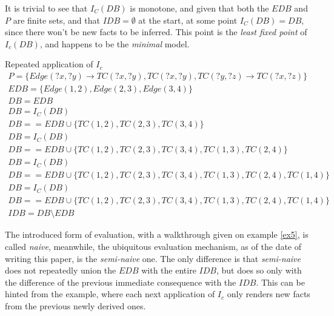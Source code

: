 It is trivial to see that $I_C(DB)$ is monotone, and given that both the $EDB$ and $P$ are finite sets, and that $IDB = \emptyset$ at the start,
at some point $I_C(DB) = DB$, since there won't be new facts to be inferred. This point is the \textit{least fixed point} of $I_c(DB)$\cite{datalog},
and happens to be the \textit{minimal} model.
\begin{exmp}{Repeated application of $I_c$}\label{ex5}
	\begin{align*}
		P = \{ Edge(?x, ?y) \rightarrow TC(?x, ?y), TC(?x, ?y), TC(?y, ?z) \rightarrow TC(?x, ?z) \} \\
		EDB = \{ Edge(1, 2), Edge(2, 3), Edge(3, 4) \}                                               \\
		DB = EDB                                                                                     \\
		DB = I_C(DB)                                                                                 \\
		DB == EDB \cup \{ TC(1, 2), TC(2, 3), TC(3, 4) \}                                            \\
		DB = I_C(DB)                                                                                 \\
		DB == EDB \cup \{ TC(1, 2), TC(2, 3), TC(3, 4), TC(1, 3), TC(2, 4) \}                        \\
		DB = I_C(DB)                                                                                 \\
		DB == EDB \cup \{ TC(1, 2), TC(2, 3), TC(3, 4), TC(1, 3), TC(2, 4), TC(1, 4) \}              \\
		DB = I_C(DB)                                                                                 \\
		DB == EDB \cup \{ TC(1, 2), TC(2, 3), TC(3, 4), TC(1, 3), TC(2, 4), TC(1, 4) \}              \\
		IDB = DB \setminus EDB
	\end{align*}
\end{exmp}
The introduced form of evaluation, with a walkthrough given on example \ref{ex5}, is called \textit{naive}, meanwhile, the ubiquitous evaluation
mechanism, as of the date of writing this paper, is the \textit{semi-naive} one. The only difference is that \textit{semi-naive} does not
repeatedly union the $EDB$ with the entire $IDB$, but does so only with the difference of the previous immediate consequence with the $IDB$. This can
be hinted from the example, where each next application of $I_c$ only renders new facts from the previous newly derived ones.

